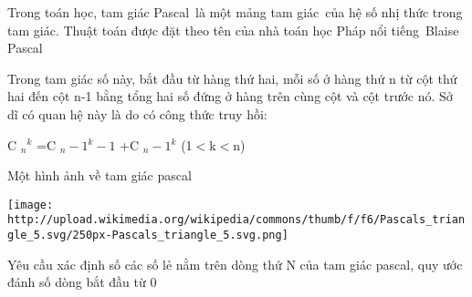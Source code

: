 Trong toán học, tam giác Pascal là một mảng tam giác của hệ số nhị thức trong tam giác. Thuật toán được đặt theo tên của nhà toán học Pháp nổi tiếng Blaise Pascal  

   Trong tam giác số này, bắt đầu từ hàng thứ hai, mỗi số ở hàng thứ n từ cột thứ hai đến cột n-1 bằng tổng hai số đứng ở hàng trên cùng cột và cột trước nó. Sở dĩ có quan hệ này là do có công thức truy hồi:  

   C   $_    n   $$^    k   $   =C   $_    n-1   $$^    k-1   $   +C   $_    n-1   $$^    k   $   (1$<$k$<$n)  

   Một hình ảnh về tam giác pascal  


\texttt{[image: http://upload.wikimedia.org/wikipedia/commons/thumb/f/f6/Pascals\_triangle\_5.svg/250px-Pascals\_triangle\_5.svg.png]}

   Yêu cầu xác định số các số lẻ nằm trên dòng thứ N của tam giác pascal, quy ước đánh số dòng bắt đầu từ 0  

\